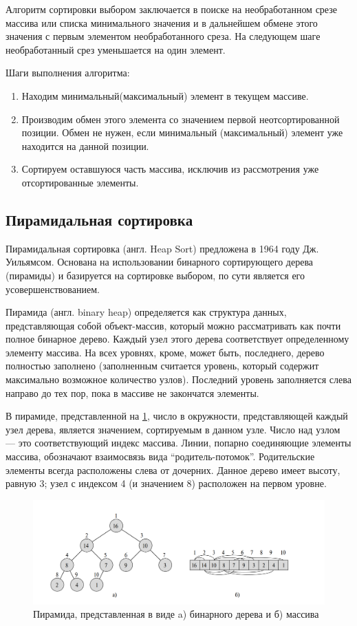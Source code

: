 Алгоритм сортировки выбором заключается в поиске на необработанном срезе массива или списка минимального значения и в дальнейшем обмене этого значения с первым элементом необработанного среза. На следующем шаге необработанный срез уменьшается на один элемент.

Шаги выполнения алгоритма:
\begin{enumerate} 
	\item Находим  минимальный(максимальный)  элемент  в  текущем  массиве. 
	\item Производим обмен этого элемента со значением первой неотсортированной позиции.  Обмен  не  нужен,  если минимальный (максимальный) элемент уже находится на данной позиции. 
	\item Сортируем оставшуюся часть массива, исключив из рассмотрения уже отсортированные элементы. 
\end{enumerate}

\subsection{Пирамидальная сортировка}

Пирамидальная сортировка \cite{book_lipachev, book_sort_algorithms,book_kormen, book_knut}  (англ. Heap Sort) предложена в 1964 году Дж. Уильямсом. Основана на использовании бинарного сортирующего дерева (пирамиды) и базируется на сортировке выбором, по сути является его усовершенствованием.

Пирамида (англ. binary heap) определяется как структура данных, представляющая собой объект-массив, который можно рассматривать как почти полное бинарное дерево. Каждый узел этого дерева соответствует определенному элементу массива. На всех уровнях, кроме, может быть, последнего, дерево полностью заполнено (заполненным считается уровень, который содержит максимально возможное количество узлов). Последний уровень заполняется слева направо до тех пор, пока в массиве не закончатся элементы. 

В пирамиде, представленной на \ref{fig:heap_structs}, число в окружности, представляющей каждый узел дерева, является значением, сортируемым в данном узле. Число над узлом — это соответствующий индекс массива. Линии, попарно соединяющие элементы массива, обозначают взаимосвязь вида “родитель-потомок”. Родительские элементы всегда расположены слева от дочерних. Данное дерево имеет высоту, равную 3; узел с индексом 4 (и значением 8) расположен на первом уровне.

\begin{figure}[h]
	\centering
	\includegraphics[height=0.25\textheight]{img/heap_structs.png}
	\caption{Пирамида, представленная в виде a) бинарного дерева и б) массива}
	\label{fig:heap_structs}
\end{figure}


